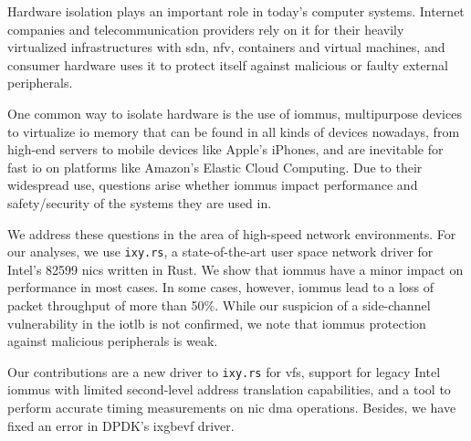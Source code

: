 \small

Hardware isolation plays an important role in today's computer systems.
Internet companies and telecommunication providers rely on it for their heavily
virtualized infrastructures with \ac{sdn}, \ac{nfv}, containers and virtual
machines, and consumer hardware uses it to protect itself against malicious or
faulty external peripherals.

One common way to isolate hardware is the use of \acp{iommu}, multipurpose
devices to virtualize \acs{io} memory that can be found in all kinds of devices
nowadays, from high-end servers to mobile devices like Apple's iPhones, and are
inevitable for fast \ac{io} on platforms like Amazon's Elastic Cloud Computing.
Due to their widespread use, questions arise whether \acp{iommu} impact
performance and safety/security of the systems they are used in.

We address these questions in the area of high-speed network environments. For
our analyses, we use \texttt{ixy.rs}, a state-of-the-art user space network
driver for Intel's 82599 \acp{nic} written in Rust. We show that \acp{iommu}
have a minor impact on performance in most cases. In some cases, however,
\acp{iommu} lead to a loss of packet throughput of more than 50\%. While our
suspicion of a side-channel vulnerability in the \acs{iotlb} is not confirmed,
we note that \acp{iommu} protection against malicious peripherals is weak.

Our contributions are a new driver to \texttt{ixy.rs} for \acp{vf}, support for
legacy Intel \acp{iommu} with limited second-level address translation
capabilities, and a tool to perform accurate timing measurements on \ac{nic}
\acs{dma} operations. Besides, we have fixed an error in DPDK's ixgbevf driver.

